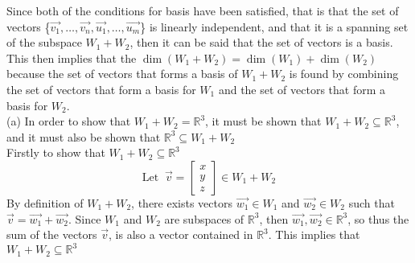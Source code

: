 \documentclass{report}
\begin{document}
\noindent Since both of the conditions for basis have been satisfied, that is that the set of vectors \{$\vec{v_1}, \ldots, \vec{v_n}, \vec{u_1}, \ldots, \vec{u_m}$\} is linearly independent, and that it is a spanning set of the subspace $W_1 + W_2$, then it can be said that the set of vectors is a basis. This then implies that the $\operatorname{dim}\left(W_1 + W_2\right) = \operatorname{dim}(W_1) + \operatorname{dim}(W_2)$ because the set of vectors that forms a basis of $W_1 + W_2$ is found by combining the set of vectors that form a basis for $W_1$ and the set of vectors that form a basis for $W_2$.
\newpage
{}
\sol \\
(a) In order to show that $W_1 + W_2 = \mathbb{R}^3$, it must be shown that $W_1 + W_2 \subseteq \mathbb{R}^3$, and it must also be shown that $\mathbb{R}^3 \subseteq W_1 + W_2$ \\
\noindent Firstly to show that $W_1 + W_2 \subseteq \mathbb{R}^3$
$$
\text{Let}\;\;\vec{v}=\begin{bmatrix} x \\ y \\ z \end{bmatrix}\in W_1 + W_2
$$
By definition of $W_1 + W_2$, there exists vectors $\vec{w_1}\in W_1$ and $\vec{w_2}\in W_2$ such that $\vec{v}=\vec{w_1}+\vec{w_2}$. Since $W_1$ and $W_2$ are subspaces of $\mathbb{R}^3$, then $\vec{w_1},\vec{w_2}\in\mathbb{R}^3$, so thus the sum of the vectors $\vec{v}$, is also a vector contained in $\mathbb{R}^3$. This implies that $W_1 + W_2 \subseteq \mathbb{R}^3$ \\
\end{document}
